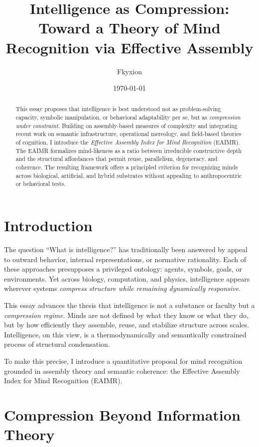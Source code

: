 \documentclass[11pt,letterpaper]{article}
\title{Intelligence as Compression:\\
Toward a Theory of Mind Recognition via Effective Assembly}
\author{Fkyxion}
\date{\today}
\begin{document}
\maketitle

\begin{abstract}
This essay proposes that intelligence is best understood not as problem-solving capacity, symbolic manipulation, or behavioral adaptability per se, but as \emph{compression under constraint}. Building on assembly-based measures of complexity and integrating recent work on semantic infrastructure, operational mereology, and field-based theories of cognition, I introduce the \emph{Effective Assembly Index for Mind Recognition} (EAIMR). The EAIMR formalizes mind-likeness as a ratio between irreducible constructive depth and the structural affordances that permit reuse, parallelism, degeneracy, and coherence. The resulting framework offers a principled criterion for recognizing minds across biological, artificial, and hybrid substrates without appealing to anthropocentric or behavioral tests.
\end{abstract}

\section{Introduction}

The question \enquote{What is intelligence?} has traditionally been answered by appeal to outward behavior, internal representations, or normative rationality. Each of these approaches presupposes a privileged ontology: agents, symbols, goals, or environments. Yet across biology, computation, and physics, intelligence appears wherever systems \emph{compress structure while remaining dynamically responsive}.

This essay advances the thesis that intelligence is not a substance or faculty but a \emph{compression regime}. Minds are not defined by what they know or what they do, but by how efficiently they assemble, reuse, and stabilize structure across scales. Intelligence, on this view, is a thermodynamically and semantically constrained process of structural condensation.

To make this precise, I introduce a quantitative proposal for mind recognition grounded in assembly theory and semantic coherence: the Effective Assembly Index for Mind Recognition (EAIMR).

\section{Compression Beyond Information Theory}
\end{document}
